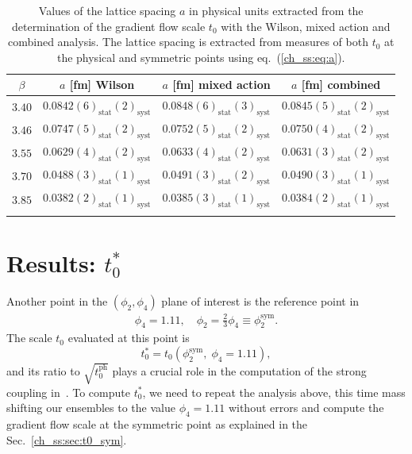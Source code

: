 \begin{longtable}{c c c c}
\label{ch_ss:tab:a}
$\beta$ & $a$ [fm] Wilson & $a$ [fm] mixed action & $a$ [fm] combined \\
\toprule
$3.40$ & $0.0842(6)_{\textrm{stat}}(2)_{\textrm{syst}}$ & $0.0848(6)_{\textrm{stat}}(3)_{\textrm{syst}}$ & $0.0845(5)_{\textrm{stat}}(2)_{\textrm{syst}}$ \\
$3.46$ & $0.0747(5)_{\textrm{stat}}(2)_{\textrm{syst}}$ & $0.0752(5)_{\textrm{stat}}(2)_{\textrm{syst}}$ & $0.0750(4)_{\textrm{stat}}(2)_{\textrm{syst}}$ \\
$3.55$ & $0.0629(4)_{\textrm{stat}}(2)_{\textrm{syst}}$ & $0.0633(4)_{\textrm{stat}}(2)_{\textrm{syst}}$ & $0.0631(3)_{\textrm{stat}}(2)_{\textrm{syst}}$ \\
$3.70$ & $0.0488(3)_{\textrm{stat}}(1)_{\textrm{syst}}$ & $0.0491(3)_{\textrm{stat}}(2)_{\textrm{syst}}$ & $0.0490(3)_{\textrm{stat}}(1)_{\textrm{syst}}$ \\
$3.85$ & $0.0382(2)_{\textrm{stat}}(1)_{\textrm{syst}}$ & $0.0385(3)_{\textrm{stat}}(1)_{\textrm{syst}}$ & $0.0384(2)_{\textrm{stat}}(1)_{\textrm{syst}}$ \\
\bottomrule
\caption{Values of the lattice spacing $a$ in physical units extracted from the determination of the gradient flow scale $t_0$ with the Wilson, mixed action and combined analysis. The lattice spacing is extracted from measures of both $t_0$ at the physical and symmetric points using eq.~(\ref{ch_ss:eq:a}).}
\end{longtable}

\section{Results: $t_0^*$}

Another point in the $(\phi_2,\phi_4)$ plane of interest is the reference point in~\citep{Bruno:2016plf}
\begin{gather}
\phi_4=1.11, \quad \phi_2=\frac{2}{3}\phi_4\equiv\phi_2^{\textrm{sym}}.
\end{gather}
The scale $t_0$ evaluated at this point is
\begin{equation}
t_0^*=t_0\left(\phi_2^{\textrm{sym}},\;\phi_4=1.11\right),
\end{equation}
and its ratio to $\sqrt{t_0^{\textrm{ph}}}$ plays a crucial role in the computation of the strong coupling in~\citep{DallaBrida:2022eua}. To compute $t_0^{*}$, we need to repeat the analysis above, this time mass shifting our ensembles to the value $\phi_4=1.11$ without errors and compute the gradient flow scale at the symmetric point as explained in the Sec.~\ref{ch_ss:sec:t0_sym}.

